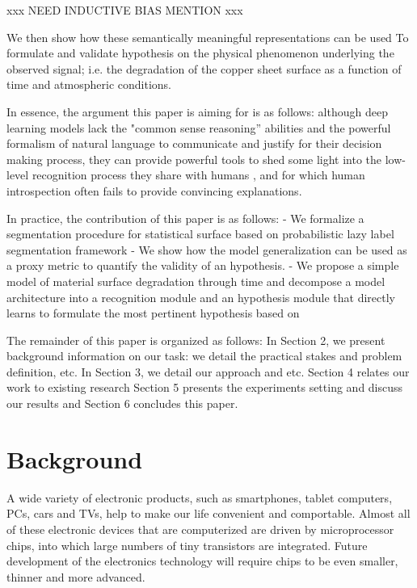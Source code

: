 \documentclass[10pt,twocolumn,letterpaper]{article}
\begin{document}
xxx NEED INDUCTIVE BIAS MENTION xxx

We then show how these semantically meaningful representations can be used
To formulate and validate hypothesis on the physical phenomenon underlying the observed signal; 
i.e. the degradation of the copper sheet surface as a function of time and atmospheric conditions.

In essence, the argument this paper is aiming for is as follows: although deep learning models 
lack the "common sense reasoning” abilities and the powerful formalism of natural language to communicate 
and justify for their decision making process, they can provide powerful tools to shed some light into the low-level
recognition process they share with humans \cite{xxx}, and for which human introspection 
often fails to provide convincing explanations.

In practice, the contribution of this paper is as follows:
- We formalize a segmentation procedure for statistical surface based on probabilistic lazy label segmentation framework
- We show how the model generalization can be used as a proxy metric to quantify the validity of an hypothesis.
- We propose a simple model of material surface degradation through time and decompose a model architecture
into a recognition module and an hypothesis module that directly learns to formulate the most pertinent hypothesis based on 

The remainder of this paper is organized as follows:
In Section 2, we present background information on our task: 
we detail the practical stakes and problem definition, etc.
In Section 3, we detail our approach and etc.
Section 4 relates our work to existing research
Section 5 presents the experiments setting and discuss our results and Section 6 concludes this paper.


\section{Background}
A wide variety of electronic products, such as smartphones, tablet computers, PCs, cars and TVs, help to make our life convenient and comportable.
Almost all of these electronic devices that are computerized are driven by microprocessor chips, into which large numbers of tiny transistors are integrated.
Future development of the electronics technology will require chips to be even smaller, thinner and more advanced.
\end{document}
